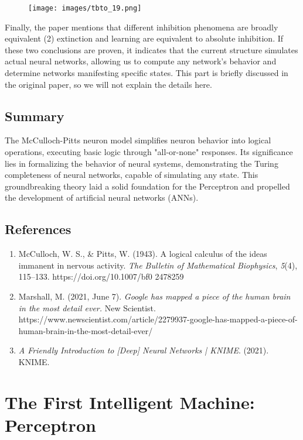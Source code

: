 \documentclass[11p,oneside]{book}
\begin{document}
\begin{figure}[H]
    \centering
    \texttt{[image: images/tbto\_19.png]}
\end{figure}

Finally, the paper mentions that different inhibition phenomena are broadly equivalent (2) extinction and learning are equivalent to absolute inhibition. If these two conclusions are proven, it indicates that the current structure simulates actual neural networks, allowing us to compute any network’s behavior and determine networks manifesting specific states. This part is briefly discussed in the original paper, so we will not explain the details here.

\section*{Summary}

The McCulloch-Pitts neuron model simplifies neuron behavior into logical operations, executing basic logic through "all-or-none" responses. Its significance lies in formalizing the behavior of neural systems, demonstrating the Turing completeness of neural networks, capable of simulating any state. This groundbreaking theory laid a solid foundation for the Perceptron and propelled the development of artificial neural networks (ANNs). 

\section*{References}

\begin{enumerate}
    \item McCulloch, W. S., \& Pitts, W. (1943). A logical calculus of the ideas immanent in nervous activity. \textit{The Bulletin of Mathematical Biophysics}, \textit{5}(4), 115–133. https://doi.org/10.1007/bf0
    2478259
    \item Marshall, M. (2021, June 7). \textit{Google has mapped a piece of the human brain in the most detail ever.} New Scientist. https://www.newscientist.com/article/2279937-google-has-mapped-a-piece-of-human-brain-in-the-most-detail-ever/
    \item \textit{A Friendly Introduction to [Deep] Neural Networks | KNIME}. (2021). KNIME. 
\end{enumerate}

\chapter{The First Intelligent Machine: Perceptron}
\end{document}
